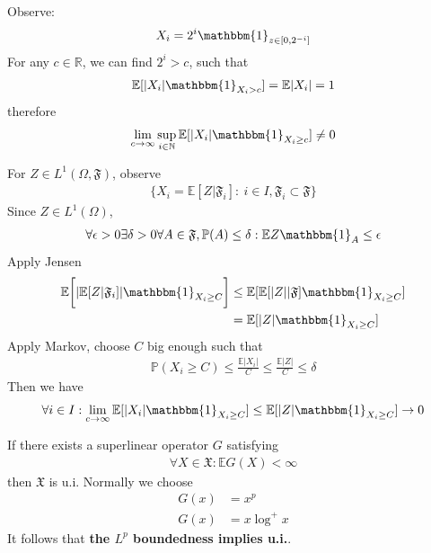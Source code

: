 \begin{example}
Observe:
\begin{equation*}
 	X_i = 2^i \mathbbm{1}_{z \in [0, 2^{-i}]}
\end{equation*}
For any $c\in \mathbb{R}$, we can find $2^i >c$, such that
\begin{align*}
	\mathbb{E}[|X_i| \mathbbm{1}_{X_i > c}] = \mathbb{E}|X_i| = 1
\end{align*}
therefore
\begin{align*}
	\lim_{c \rightarrow \infty} \sup_{i\in \mathbb{N}} \mathbb{E}[|X_i| \mathbbm{1}_{X_i \ge c}] \ne 0
\end{align*}
\end{example}

\begin{example}
For $Z \in L^1(\Omega, \mathfrak{F})$,  observe
\begin{align*}
	\bigg\{ X_i =  \mathbb{E}[Z|\mathfrak{F}_i]: \ i \in I, \mathfrak{F}_i \subset \mathfrak{F}\bigg\}
\end{align*} 
Since $Z\in L^1(\Omega)$, 
\begin{align*}
	\forall \epsilon > 0 \exists \delta >0 \forall A\in \mathfrak{F}, \mathbb{P}(A) \le \delta: \mathbb{E}Z\mathbbm{1}_{A} \le \epsilon
\end{align*}
Apply Jensen
\begin{align*}
	\mathbb{E}\bigg[ |\mathbb{E}[Z|\mathfrak{F}_i]| \mathbbm{1}_{X_i \ge C}\bigg]
	&\le \mathbb{E}[ \mathbb{E}[|Z||\mathfrak{F}] \mathbbm{1}_{X_i \ge C}]\\
	&= \mathbb{E}[|Z| \mathbbm{1}_{X_i \ge C}]
\end{align*}
Apply Markov, choose $C$ big enough such that
\begin{align*}
	\mathbb{P}(X_i \ge C) \le \frac{\mathbb{E}|X_i|}{C}\le \frac{\mathbb{E}|Z|}{C} \le \delta
\end{align*}
Then we have
\begin{align*}
	\forall i \in I: \lim_{c \rightarrow \infty} \mathbb{E}[|X_i| \mathbbm{1}_{X_i \ge C}] \le \mathbb{E}[|Z|\mathbbm{1}_{X_i \ge C}] \rightarrow   0
\end{align*}
\end{example}

\begin{example}
	If there exists a superlinear operator $G$ satisfying 
	\begin{align*}
		\forall X \in \mathfrak{X}: \mathbb{E}G(X) < \infty
	\end{align*}
	then $\mathfrak{X}$ is u.i. Normally we choose
	\begin{align*}
		G(x) &= x^p\\
		G(x) &= x \log^+ x
	\end{align*}
	It follows that \textbf{the $L^p$ boundedness implies u.i.}.
\end{example}



